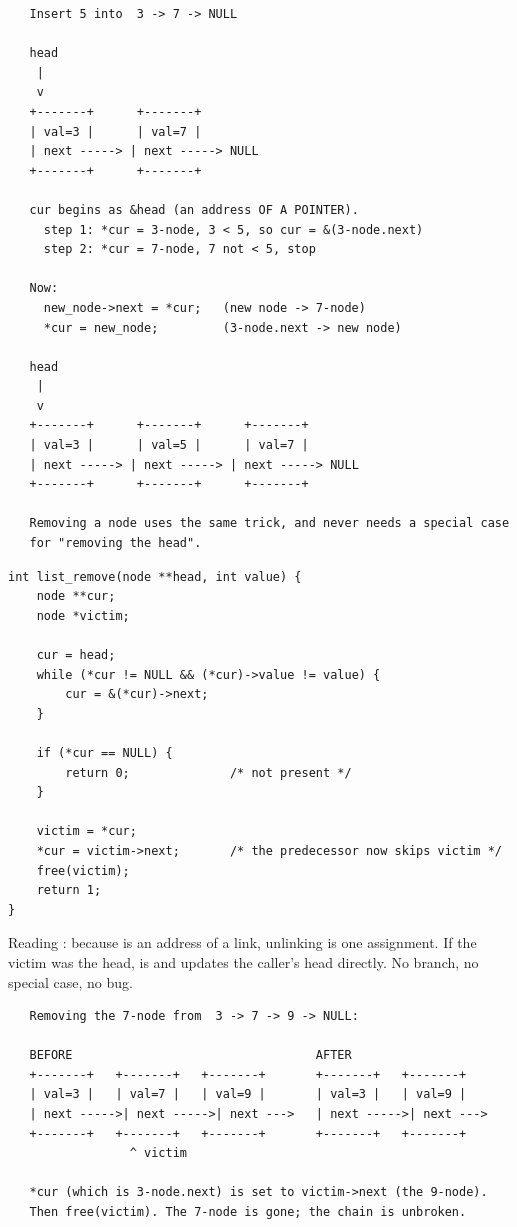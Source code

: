 \begin{verbatim}
   Insert 5 into  3 -> 7 -> NULL

   head
    |
    v
   +-------+      +-------+
   | val=3 |      | val=7 |
   | next -----> | next -----> NULL
   +-------+      +-------+

   cur begins as &head (an address OF A POINTER).
     step 1: *cur = 3-node, 3 < 5, so cur = &(3-node.next)
     step 2: *cur = 7-node, 7 not < 5, stop

   Now:
     new_node->next = *cur;   (new node -> 7-node)
     *cur = new_node;         (3-node.next -> new node)

   head
    |
    v
   +-------+      +-------+      +-------+
   | val=3 |      | val=5 |      | val=7 |
   | next -----> | next -----> | next -----> NULL
   +-------+      +-------+      +-------+

   Removing a node uses the same trick, and never needs a special case
   for "removing the head".
\end{verbatim}

\begin{lstlisting}[caption={Remove the first node holding value.}]
int list_remove(node **head, int value) {
    node **cur;
    node *victim;

    cur = head;
    while (*cur != NULL && (*cur)->value != value) {
        cur = &(*cur)->next;
    }

    if (*cur == NULL) {
        return 0;              /* not present */
    }

    victim = *cur;
    *cur = victim->next;       /* the predecessor now skips victim */
    free(victim);
    return 1;
}
\end{lstlisting}

Reading : because  is an address of a
link, unlinking is one assignment. If the victim was the head,
 is  and  updates the caller's head
directly. No branch, no special case, no bug.

\begin{verbatim}
   Removing the 7-node from  3 -> 7 -> 9 -> NULL:

   BEFORE                                  AFTER
   +-------+   +-------+   +-------+       +-------+   +-------+
   | val=3 |   | val=7 |   | val=9 |       | val=3 |   | val=9 |
   | next ----->| next ----->| next --->   | next ----->| next --->
   +-------+   +-------+   +-------+       +-------+   +-------+
                 ^ victim

   *cur (which is 3-node.next) is set to victim->next (the 9-node).
   Then free(victim). The 7-node is gone; the chain is unbroken.
\end{verbatim}

